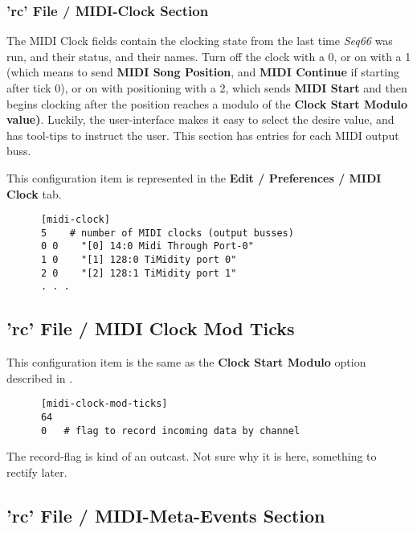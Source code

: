 \subsubsection{'rc' File / MIDI-Clock Section}
\label{subsec:configuration_rc_midi_clock}

   The MIDI Clock fields contain the clocking state from the last 
   time \textsl{Seq66} was run, and their status, and their names.
   Turn off the clock with a 0, or on
   with a 1 (which means to send
   \textbf{MIDI Song Position}, and
   \textbf{MIDI Continue} if
   starting after tick 0), or on with positioning with a 2, which sends
   \textbf{MIDI Start}
   and then begins clocking after the position reaches a modulo of the
   \textbf{Clock Start Modulo value)}.  Luckily, the user-interface makes it
   easy to select the desire value, and has tool-tips to instruct the user.
   This section has entries for each MIDI output buss.

   This configuration item is represented in the
   \textbf{Edit / Preferences / MIDI Clock} tab.

   \begin{verbatim}
      [midi-clock]
      5    # number of MIDI clocks (output busses)
      0 0    "[0] 14:0 Midi Through Port-0"
      1 0    "[1] 128:0 TiMidity port 0"
      2 0    "[2] 128:1 TiMidity port 1"
      . . .
   \end{verbatim}

\subsection{'rc' File / MIDI Clock Mod Ticks}
\label{subsec:configuration_midi_cmt}

   This configuration item is the same as the
   \textbf{Clock Start Modulo} option described in
   .

   \begin{verbatim}
      [midi-clock-mod-ticks]
      64
      0   # flag to record incoming data by channel
   \end{verbatim}

   The record-flag is kind of an outcast.  Not sure why it is here,
   something to rectify later.

\subsection{'rc' File / MIDI-Meta-Events Section}
\label{subsec:configuration_midi_meta_events}

